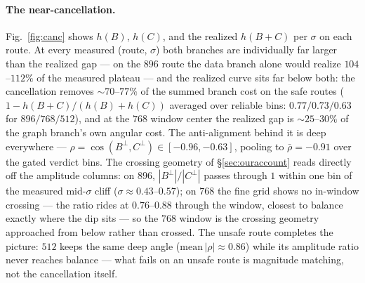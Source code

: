 \paragraph{The near-cancellation.}
Fig.~\ref{fig:canc} shows $h(B)$, $h(C)$, and the realized
$h(B{+}C)$ per $\sigma$ on each route. At every measured
(route, $\sigma$) both branches are individually far larger than the
realized gap --- on the $896$ route the data branch alone would
realize $104$--$112\%$ of the measured plateau --- and the realized
curve sits far below both: the cancellation removes
${\sim}70$--$77\%$ of the summed branch cost on the safe routes
($1 - h(B{+}C)/(h(B){+}h(C))$ averaged over reliable bins:
$0.77/0.73/0.63$ for $896/768/512$), and at the $768$ window center
the realized gap is ${\sim}25$--$30\%$ of the graph branch's own
angular cost. The anti-alignment behind it is deep everywhere ---
$\rho = \cos(B^{\perp}, C^{\perp}) \in [-0.96, -0.63]$, pooling to
$\bar\rho = -0.91$ over the gated verdict bins. The crossing geometry of
\S\ref{sec:ouraccount} reads directly off the amplitude columns: on
$896$, $|B^{\perp}|/|C^{\perp}|$ passes through $1$ within one bin of
the measured mid-$\sigma$ cliff ($\sigma \approx 0.43$--$0.57$); on
$768$ the fine grid shows no in-window crossing --- the ratio rides
at $0.76$--$0.88$ through the window, closest to balance exactly
where the dip sits --- so the $768$ window is the crossing geometry
approached from below rather than crossed. The unsafe route completes
the picture: $512$ keeps the same deep angle
($\mathrm{mean}\,|\rho| \approx 0.86$) while its amplitude ratio
never reaches balance --- what fails on an unsafe route is magnitude
matching, not the cancellation itself.

